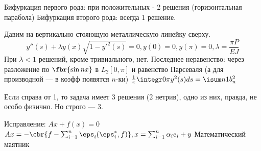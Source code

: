 Бифуркация первого рода: при положительных - 2 решения (горизонтальная парабола)
Бифуркация второго рода: всегда 1 решение.

Давим на вертикально стояющую металлическую линейку сверху.
$$y''(s) + \lambda y(x)\sqrt{1-y'^2(s)} = 0, y(0) = 0, y(\pi) = 0, \lambda = \frac{\pi P}{EJ}$$
При $\lambda < 1$ решений, кроме тривиального, нет.
Последнее неравенство: через разложение по $\fbr{\sin nx}$ в $L_2[0, \pi]$ и равенство Парсеваля (а для производной --- в коэфф появятся $n$-ки) $\frac1\pi\integr 0\pi y^2(s)ds = \isum n1 b_n^2$

Если справа от 1, то задача имеет 3 решения (2 нетрив), одно из них, правда, не особо физично. Но строго --- 3.


Исправление:
$Ax + f(x) = 0$
$Ax = -\cbr{f - \sum_{i=1}^n\eps_i(\eps_i^*,f)}, x = \sum_{i=1}^n\alpha_i e_i + y$
Математический маятник
